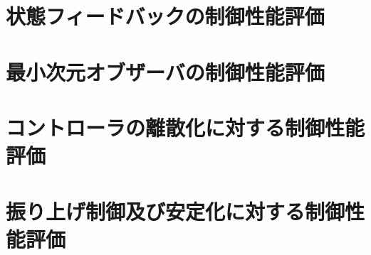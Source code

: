 \section{状態フィードバックの制御性能評価}
\section{最小次元オブザーバの制御性能評価}
\section{コントローラの離散化に対する制御性能評価}
\section{振り上げ制御及び安定化に対する制御性能評価}
